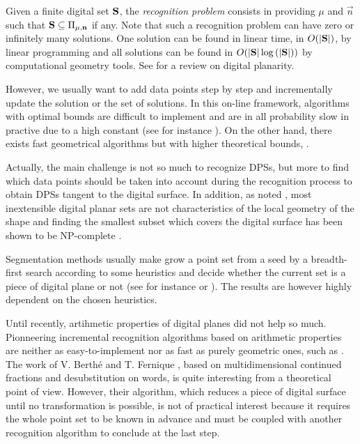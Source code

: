 Given a finite digital set $\mathbf{S}$, the \emph{recognition problem} consists in providing
$\mu$ and $\vec{n}$ such that $\mathbf{S} \subseteq \Pi_{\mu,\mathbf{n}}$ if any.
Note that such a recognition problem can have zero or infinitely many solutions.
One solution can be found in linear time, \ie in $O(|\mathbf{S}|)$, by linear programming
and all solutions can be found in $O(|\mathbf{S}|\log{(|\ensuremath{\mathbf{S}}|)})$ by computational geometry tools.
See \cite{Brimkov2007} for a review on digital planarity.

However, we usually want to add data points step by step and incrementally update the solution
or the set of solutions. In this on-line framework, algorithms with optimal bounds are difficult
to implement and are in all probability slow in practive due to a high constant (see for instance
\cite{Buzer2003}).
On the other hand, there exists fast geometrical algorithms but with higher theoretical bounds,
\eg \cite{Gerard2005, Charrier2008, Veelaert2012}.

Actually, the main challenge is not so much to recognize DPSs, but more to find which data points
should be taken into account during the recognition process to obtain DPSs tangent to the digital
surface. In addition, as noted \cite{Charrier2011}, most inextensible digital planar sets are not
characteristics of the local geometry of the shape and finding the smallest subset which covers
the digital surface has been shown to be NP-complete \cite{Sivignon2009}.

Segmentation methods usually make grow a point set from a seed by a breadth-first search according
to some heuristics and decide whether the current set is a piece of digital plane or not
(see for instance \cite{Klette2001} or \cite{Sivignon2004}). 
The results are however highly dependent on the chosen heuristics.   

Until recently, artihmetic properties of digital planes did not help so much.
Pionneering incremental recognition algorithms based on arithmetic properties
\cite{Debled1994,Mesmoudi2002} are neither as easy-to-implement nor as fast as
purely geometric ones, such as \cite{Gerard2005}.  
The work of V. Berth\'{e} and T. Fernique \cite{Fernique2009,Berthe2011}, 
based on multidimensional continued fractions and desubstitution on words,
is quite interesting from a theoretical point of view. However, their algorithm,
which reduces a piece of digital surface until no transformation is possible,
is not of practical interest because it requires the whole point set to be known
in advance and must be coupled with another recognition algorithm to conclude
at the last step.  

